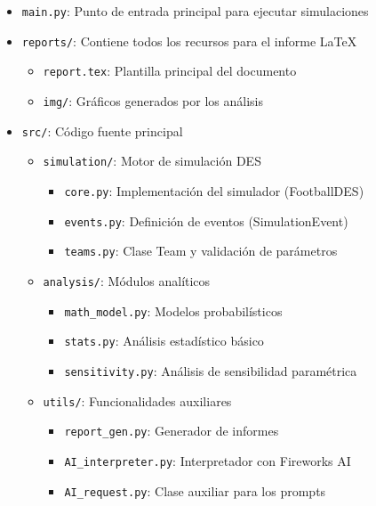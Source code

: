 \documentclass{article}
\begin{document}
\begin{itemize}
    \item \texttt{main.py}: Punto de entrada principal para ejecutar simulaciones
    \item \texttt{reports/}: Contiene todos los recursos para el informe LaTeX
    \begin{itemize}
        \item \texttt{report.tex}: Plantilla principal del documento
        \item \texttt{img/}: Gráficos generados por los análisis
    \end{itemize}
    
    \item \texttt{src/}: Código fuente principal
    \begin{itemize}
        \item \texttt{simulation/}: Motor de simulación DES
        \begin{itemize}
            \item \texttt{core.py}: Implementación del simulador (FootballDES)
            \item \texttt{events.py}: Definición de eventos (SimulationEvent)
            \item \texttt{teams.py}: Clase Team y validación de parámetros
        \end{itemize}
        
        \item \texttt{analysis/}: Módulos analíticos
        \begin{itemize}
            \item \texttt{math\_model.py}: Modelos probabilísticos
            \item \texttt{stats.py}: Análisis estadístico básico
            \item \texttt{sensitivity.py}: Análisis de sensibilidad paramétrica
        \end{itemize}
        
        \item \texttt{utils/}: Funcionalidades auxiliares
        \begin{itemize}
            \item \texttt{report\_gen.py}: Generador de informes 
            \item \texttt{AI\_interpreter.py}: Interpretador con Fireworks AI
            \item \texttt{AI\_request.py}: Clase auxiliar para los prompts

        \end{itemize}
    \end{itemize}
\end{itemize}
\end{document}
